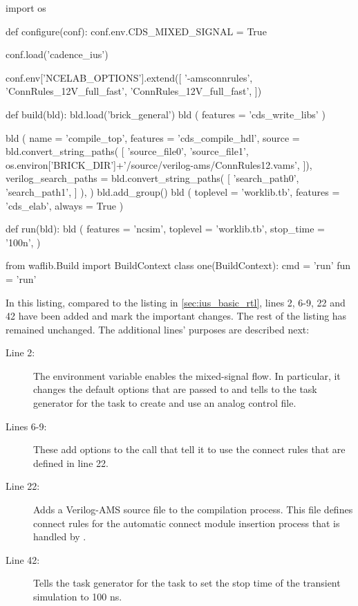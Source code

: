 \begin{lstwscript}
import os

def configure(conf):
    conf.env.CDS_MIXED_SIGNAL = True

    conf.load('cadence_ius')

    conf.env['NCELAB_OPTIONS'].extend([
        '-amsconnrules', 'ConnRules_12V_full_fast',
        'ConnRules_12V_full_fast',
    ])

def build(bld):
    bld.load('brick_general')
    bld ( features = 'cds_write_libs' )

    bld (
        name = 'compile_top',
        features = 'cds_compile_hdl',
        source = bld.convert_string_paths(
            [
                'source_file0',
                'source_file1',
                os.environ['BRICK_DIR']+'/source/verilog-ams/ConnRules12.vams',
            ]),
        verilog_search_paths = bld.convert_string_paths(
            [
                'search_path0',
                'search_path1',
            ]
        ),
    )
    bld.add_group()
    bld (
        toplevel = 'worklib.tb',
        features = 'cds_elab',
        always = True
    )   

def run(bld):
    bld (
        features = 'ncsim',
        toplevel = 'worklib.tb',
        stop_time = '100n',
    )   

from waflib.Build import BuildContext
class one(BuildContext):
    cmd = 'run'
    fun = 'run'
\end{lstwscript}

In this listing, compared to the listing in \cref{sec:ius_basic_rtl}, lines 2,
6-9, 22 and 42 have been added and mark the important changes. The rest of the
listing has remained unchanged. The additional lines' purposes are described
next:
\begin{description}
    \item[Line 2:] The environment variable  enables the
 mixed-signal flow. In particular, it changes the default options that are
 passed to  and tells to the task generator for the  task
 to create and use an analog control file.
    \item[Lines 6-9:] These add options to the  call that tell it to
 use the connect rules that are defined in line 22.
    \item[Line 22:] Adds a Verilog-AMS source file to the compilation process.
 This file defines connect rules for the automatic connect module insertion
 process that is handled by .
    \item[Line 42:] Tells the task generator for the  task to set the
 stop time of the transient simulation to 100 ns.
\end{description}


